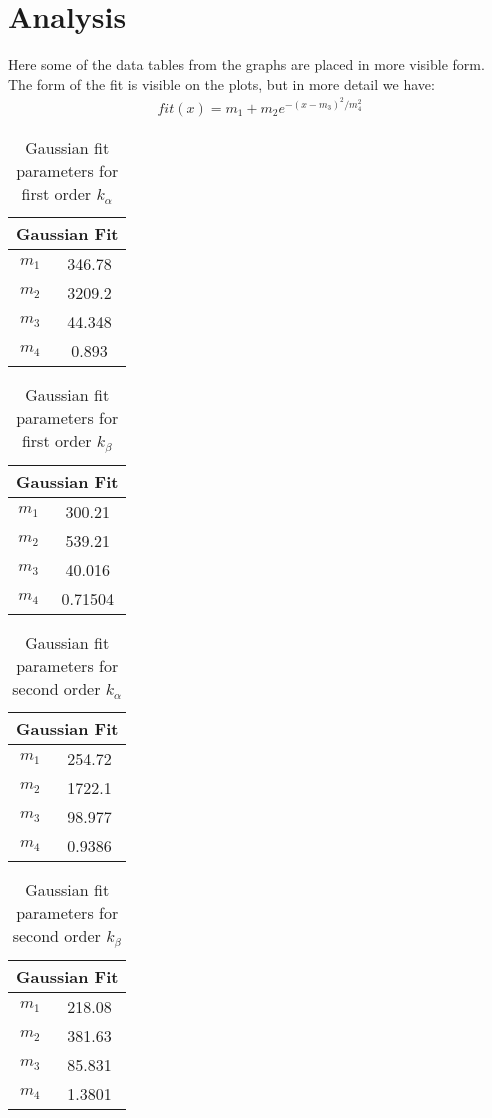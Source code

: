 \documentclass[letterpaper,12pt]{article}
\begin{document}
\section{Analysis}
Here some of the data tables from the graphs are placed in more visible form. The form of the fit is visible on the plots, but in more detail we have:
\begin{align*}
  fit(x)=m_1+m_2e^{-(x-m_3)^2/m_4^2}
\end{align*}
\begin{table}[H]
\centering
\begin{tabular}{cc}
\multicolumn{2}{c}{Gaussian Fit}    \\ \hline
\multicolumn{1}{c|}{$m_1$} & 346.78 \\
\multicolumn{1}{c|}{$m_2$} & 3209.2 \\
\multicolumn{1}{c|}{$m_3$} & 44.348 \\
\multicolumn{1}{c|}{$m_4$} & 0.893 
\end{tabular}
\caption{Gaussian fit parameters for first order $k_\alpha$}
\end{table}
\begin{table}[H]
\centering
\begin{tabular}{cc}
\multicolumn{2}{c}{Gaussian Fit}     \\ \hline
\multicolumn{1}{c|}{$m_1$} & 300.21  \\
\multicolumn{1}{c|}{$m_2$} & 539.21  \\
\multicolumn{1}{c|}{$m_3$} & 40.016  \\
\multicolumn{1}{c|}{$m_4$} & 0.71504
\end{tabular}
\caption{Gaussian fit parameters for first order $k_\beta$}
\end{table}
\begin{table}[H]
\centering
\begin{tabular}{cc}
\multicolumn{2}{c}{Gaussian Fit}     \\ \hline
\multicolumn{1}{c|}{$m_1$} & 254.72  \\
\multicolumn{1}{c|}{$m_2$} & 1722.1  \\
\multicolumn{1}{c|}{$m_3$} & 98.977  \\
\multicolumn{1}{c|}{$m_4$} & 0.9386
\end{tabular}
\caption{Gaussian fit parameters for second order $k_\alpha$}
\end{table}
\begin{table}[H]
\centering
\begin{tabular}{cc}
\multicolumn{2}{c}{Gaussian Fit}     \\ \hline
\multicolumn{1}{c|}{$m_1$} & 218.08  \\
\multicolumn{1}{c|}{$m_2$} & 381.63  \\
\multicolumn{1}{c|}{$m_3$} & 85.831  \\
\multicolumn{1}{c|}{$m_4$} & 1.3801
\end{tabular}
\caption{Gaussian fit parameters for second order $k_\beta$}
\end{table}
\end{document}
